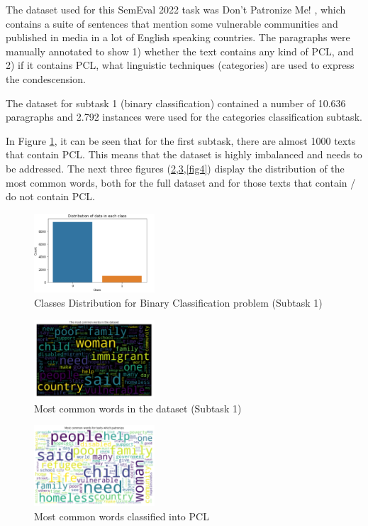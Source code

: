 \documentclass[11pt]{article}
\begin{document}
The dataset used for this SemEval 2022 task was Don't Patronize Me! \cite{perezalmendros2020dont},
which contains a suite of sentences that mention some vulnerable communities
and published in media in a lot of English speaking countries. The
paragraphs were manually annotated to show 1) whether the text contains any
kind of PCL, and 2) if it contains PCL, what linguistic techniques
(categories) are used to express the condescension.

The dataset for subtask 1 (binary classification) contained a number of
10.636 paragraphs and 2.792 instances were used for the categories
classification subtask.

In Figure \ref{fig1}, it can be seen that for the first subtask, there are almost
1000 texts that contain PCL. This means that the dataset is highly imbalanced and needs to be addressed.
The next three figures (\ref{fig2},\ref{fig3},\ref{fig4}) display the distribution
of the most common words, both for the full dataset and for those texts that contain
/ do not contain PCL.


\begin{figure}[ht]
	\centering
	\includegraphics[width=0.4\textwidth]{DataDistribution.png}
	\caption{Classes Distribution for Binary Classification problem (Subtask 1)}
	\label{fig1}
\end{figure}

\begin{figure}[ht]
	\centering
	\includegraphics[width=0.4\textwidth]{common.png}
	\caption{Most common words in the dataset (Subtask 1)}
	\label{fig2}
\end{figure}

\begin{figure}[ht]
	\centering
	\includegraphics[width=0.4\textwidth]{pcl.png}
	\caption{Most common words classified into PCL}
	\label{fig3}
\end{figure}
\end{document}
